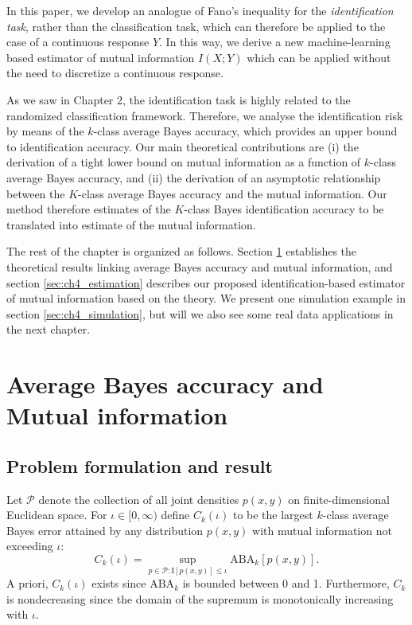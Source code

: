 In this paper, we develop an analogue of Fano's inequality for the
\emph{identification task}, rather than the classification task, which
can therefore be applied to the case of a continuous response $Y$.  In
this way, we derive a new machine-learning based estimator of mutual
information $I(X; Y)$ which can be applied without the need to
discretize a continuous response.

As we saw in Chapter 2, the identification task is highly related to
the randomized classification framework.  Therefore, we analyse the
identification risk by means of the $k$-class average Bayes accuracy,
which provides an upper bound to identification accuracy.  Our main
theoretical contributions are (i) the derivation of a tight lower
bound on mutual information as a function of $k$-class average Bayes
accuracy, and (ii) the derivation of an asymptotic relationship
between the $K$-class average Bayes accuracy and the mutual
information. Our method therefore estimates of the $K$-class Bayes
identification accuracy to be translated into estimate of the mutual
information.

The rest of the chapter is organized as follows.  Section
\ref{sec:ch4_theory} establishes the theoretical results linking
average Bayes accuracy and mutual information, and section
\ref{sec:ch4_estimation} describes our proposed identification-based
estimator of mutual information based on the theory.  We present one
simulation example in section \ref{sec:ch4_simulation}, but will we
also see some real data applications in the next chapter.

\section{Average Bayes accuracy and Mutual information}\label{sec:ch4_theory}

\subsection{Problem formulation and result}

Let $\mathcal{P}$ denote the collection of all joint densities $p(x,
y)$ on finite-dimensional Euclidean space.  For $\iota \in [0,\infty)$
define $C_k(\iota)$ to be the largest $k$-class average Bayes error
attained by any distribution $p(x,y)$ with mutual information not
exceeding $\iota$:
\[
C_k(\iota) = \sup_{p \in \mathcal{P}: \text{I}[p(x,y)] \leq \iota} \text{ABA}_k[p(x,y)].
\]
A priori, $C_k(\iota)$ exists since $\text{ABA}_k$ is bounded between
0 and 1.  Furthermore, $C_k$ is nondecreasing since the domain of the
supremum is monotonically increasing with $\iota$.

